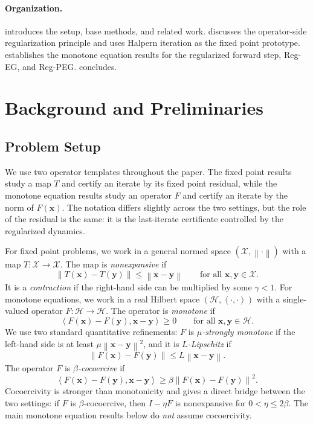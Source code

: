 \documentclass[letterpaper,11pt]{article}
\newcommand{\norm}[1]{\left\| #1 \right\|}
\newcommand{\angles}[1]{\left\langle #1 \right \rangle}
\newcommand{\vect}[1]{\mathbf{#1}}
\begin{document}
\paragraph{Organization.}
 introduces the setup, base methods, and related work.
 discusses the operator-side
regularization principle and uses Halpern iteration as the fixed point
prototype.  establishes the monotone equation results
for the regularized forward step, Reg-EG, and Reg-PEG.
 concludes.

\section{Background and Preliminaries}
\label{sec:setup}

\subsection{Problem Setup}
\label{sec:problems}

We use two operator templates throughout the paper. The fixed point results
study a map \(T\) and certify an iterate by its fixed point residual, while the
monotone equation results study an operator \(F\) and certify an iterate by the
norm of \(F(\vect{x})\). The notation differs slightly across the two settings, but the
role of the residual is the same: it is the last-iterate certificate controlled
by the regularized dynamics.

For fixed point problems, we work in a general normed space
\((\mathcal X,\norm{\cdot})\) with a map \(T:\mathcal X\to\mathcal X\). The map
is \emph{nonexpansive} if
\[
    \norm{T(\vect{x})-T(\vect{y})}
    \le
    \norm{\vect{x}-\vect{y}}
    \qquad
    \text{for all }\vect{x},\vect{y}\in\mathcal X.
\]
It is a \emph{contraction} if the right-hand side can be multiplied by some
\(\gamma<1\). For monotone equations, we work in a real Hilbert space
\((\mathcal H,\angles{\cdot,\cdot})\) with a single-valued operator
\(F:\mathcal H\to\mathcal H\). The operator is \emph{monotone} if
\[
    \angles{F(\vect{x})-F(\vect{y}),\vect{x}-\vect{y}}\ge0
    \qquad
    \text{for all }\vect{x},\vect{y}\in\mathcal H.
\]
We use two standard quantitative refinements: \(F\) is
\emph{\(\mu\)-strongly monotone} if the left-hand side is at least
\(\mu\norm{\vect{x}-\vect{y}}^2\), and it is \emph{\(L\)-Lipschitz} if
\[
    \norm{F(\vect{x})-F(\vect{y})}
    \le
    L\norm{\vect{x}-\vect{y}}.
\]
The operator \(F\) is \emph{\(\beta\)-cocoercive} if
\[
    \angles{F(\vect{x})-F(\vect{y}),\vect{x}-\vect{y}}
    \ge
    \beta\norm{F(\vect{x})-F(\vect{y})}^2.
\]
Cocoercivity is stronger than monotonicity and gives a direct bridge between
the two settings: if \(F\) is \(\beta\)-cocoercive, then \(I-\eta F\) is
nonexpansive for \(0<\eta\le2\beta\). The main monotone equation results below
do \textit{not} assume cocoercivity.
\end{document}
